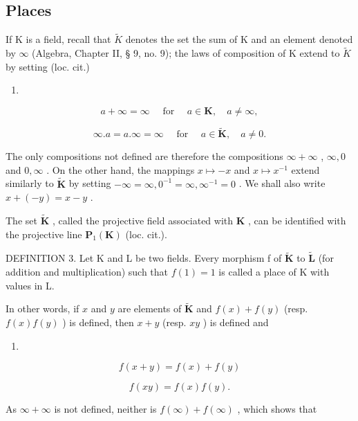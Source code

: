 \subsection{Places}

If K is a field, recall that \(\tilde{K}\) denotes the set the sum of K and an element denoted by \(\infty\) (Algebra, Chapter II, § 9, no. 9); the laws of composition of K extend to \(\tilde{K}\) by setting (loc. cit.)

\begin{enumerate}
\def\labelenumi{(\arabic{enumi})}
\setcounter{enumi}{1}
\tightlist
\item
\end{enumerate}

\[
a + \infty = \infty \quad \text { for } \quad a \in \mathbf {K}, \quad a \neq \infty ,\tag{2}
\]

\[
\infty . a = a. \infty = \infty \quad \text {   for   } \quad a \in \tilde {\mathbf {K}}, \quad a \neq 0.\tag{3}
\]

The only compositions not defined are therefore the compositions \(\infty + \infty\) , \(\infty, 0\) and \(0, \infty\) . On the other hand, the mappings \(x \mapsto -x\) and \(x \mapsto x^{-1}\) extend similarly to \(\tilde{\mathbf{K}}\) by setting \(-\infty = \infty, 0^{-1} = \infty, \infty^{-1} = 0\) . We shall also write \(x + (-y) = x - y\) .

The set \(\tilde{\mathbf{K}}\) , called the projective field associated with \(\mathbf{K}\) , can be identified with the projective line \(\mathbf{P}_1(\mathbf{K})\) (loc. cit.).

DEFINITION 3. Let K and L be two fields. Every morphism f of \(\tilde{\mathbf{K}}\) to \(\tilde{\mathbf{L}}\) (for addition and multiplication) such that \(f(1) = 1\) is called a place of K with values in L.

In other words, if \(x\) and \(y\) are elements of \(\tilde{\mathbf{K}}\) and \(f(x) + f(y)\) (resp. \(f(x)f(y)\) ) is defined, then \(x + y\) (resp. \(xy\) ) is defined and

\begin{enumerate}
\def\labelenumi{(\arabic{enumi})}
\setcounter{enumi}{3}
\tightlist
\item
\end{enumerate}

\[
f (x + y) = f (x) + f (y)\tag{4}
\]

\[
f (x y) = f (x) f (y).\tag{5}
\]

As \(\infty +\infty\) is not defined, neither is \(f(\infty) + f(\infty)\) , which shows that

